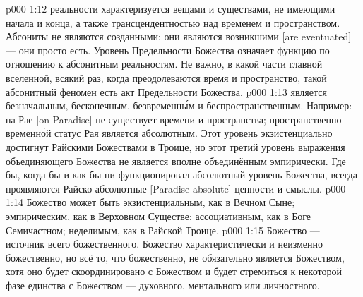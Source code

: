 \vs p000 1:12 \pc {}  реальности характеризуется вещами и существами, не имеющими начала и конца, а также трансцендентностью над временем и пространством. Абсониты не являются созданными; они являются возникшими [are eventuated] --- они просто есть. Уровень Предельности Божества означает функцию по отношению к абсонитным реальностям. Не важно, в какой части главной вселенной, всякий раз, когда преодолеваются время и пространство, такой абсонитный феномен есть акт Предельности Божества.
\vs p000 1:13 \pc {} является безначальным, бесконечным, безвременн\'ым и беспространственным. Например: на Рае [on Paradise] не существует времени и пространства; пространственно\hyp{}временн\'ой статус Рая является абсолютным. Этот уровень экзистенциально достигнут Райскими Божествами в Троице, но этот третий уровень выражения объединяющего Божества не является вполне объединённым эмпирически. Где бы, когда бы и как бы ни функционировал абсолютный уровень Божества, всегда проявляются Райско\hyp{}абсолютные [Paradise\hyp{}absolute] ценности и смыслы.
\vs p000 1:14 \pc Божество может быть экзистенциальным, как в Вечном Сыне; эмпирическим, как в Верховном Существе; ассоциативным, как в Боге Семичастном; неделимым, как в Райской Троице.
\vs p000 1:15 Божество --- источник всего божественного. Божество характеристически и неизменно божественно, но всё то, что божественно, не обязательно является Божеством, хотя оно будет скоординировано с Божеством и будет стремиться к некоторой фазе единства с Божеством --- духовного, ментального или личностного.
